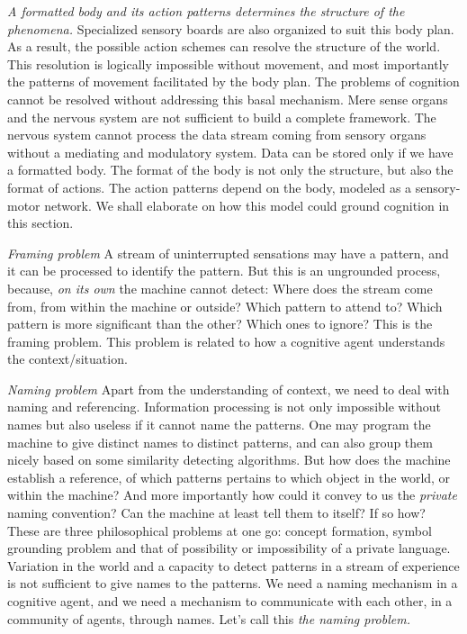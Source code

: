 \emph{A formatted body and its action patterns determines the structure of the phenomena.} Specialized sensory boards are also organized to suit this body plan. As a result, the possible action schemes can resolve the structure of the world. This resolution is logically impossible without movement, and most importantly the patterns of movement facilitated by the body plan. The problems of cognition cannot be resolved without addressing this basal mechanism. Mere sense organs and the nervous system are not sufficient to build a complete framework. The nervous system cannot process the data stream coming from sensory organs without a mediating and modulatory system. Data can be stored only if we have a formatted body. The format of the body is not only the structure, but also the format of actions. The action patterns depend on the body, modeled as a sensory-motor network.  We shall elaborate on how this model could ground cognition in this section.

\emph{Framing problem} A stream of uninterrupted sensations may have a pattern, and it can be processed to identify the pattern. But this is an ungrounded process, because, \textit{on its own} the machine cannot detect: Where does the stream come from, from within the machine or outside? Which pattern to attend to? Which pattern is more significant than the other? Which ones to ignore? This is the framing problem. This problem is related to how a cognitive agent understands the context/situation. 

\emph{Naming problem} Apart from the understanding of context, we need to deal with naming and referencing. Information processing is not only impossible without names but also useless if it cannot name the patterns. One may program the machine to give distinct names to distinct patterns, and can also group them nicely based on some similarity detecting algorithms. But how does the machine establish a reference, of which patterns pertains to which object in the world, or within the machine? And more importantly how could it convey to us the \textit{private} naming convention?  Can the machine at least tell them to itself?  If so how? These are three philosophical problems at one go: concept formation, symbol grounding problem and that of possibility or impossibility of a private language. Variation in the world and a capacity to detect patterns in a stream of experience is not sufficient to give names to the patterns. We need a naming mechanism in a cognitive agent, and we need a mechanism to communicate with each other, in a community of agents, through names. Let's call this \textit{the naming problem.} 


